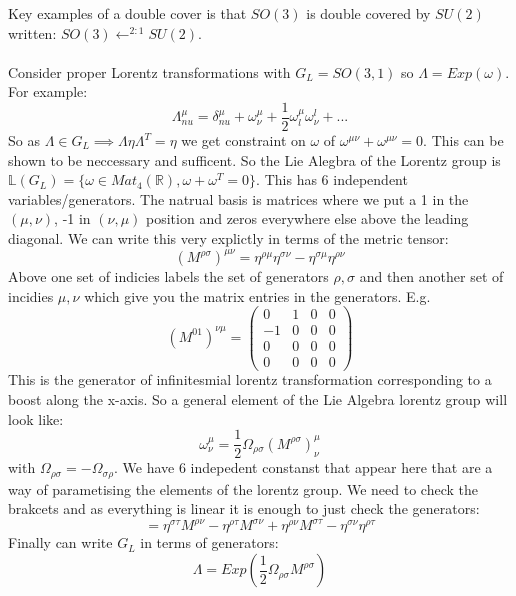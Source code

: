 \documentclass[12pt, a4paper, twoside, titlepage]{article}
\begin{document}
Key examples of a double cover is that $SO(3)$ is double covered by $SU(2)$ written: $SO(3) \leftarrow^{2:1} SU(2)$.\\\\
Consider proper Lorentz transformations with $G_L = SO(3,1)$ so $\Lambda = Exp(\omega)$. For example: $$\Lambda^{\mu}_{nu}  = \delta^{\mu}_{nu} + \omega^{\mu}_{\nu} + \frac{1}{2} \omega^{\mu}_l \omega^l_{\nu} + ...$$
So as $\Lambda \in G_L \implies \Lambda \eta \Lambda^T = \eta$ we get constraint on $\omega$ of $\omega^{\mu \nu} + \omega^{\mu \nu} = 0$. This can be shown to be neccessary and sufficent. So the Lie Alegbra of the Lorentz group is $\mathbb{L}(G_L) = \{\omega \in Mat_4(\mathbb{R}), \omega + \omega^T = 0\}$. This has 6 independent variables/generators. The natrual basis is matrices where we put a 1 in the $(\mu, \nu)$, -1 in $(\nu, \mu)$ position and zeros everywhere else above the leading diagonal. We can write this very explictly in terms of the metric tensor:
$$
(M^{\rho \sigma})^{\mu \nu} = \eta^{\rho \mu} \eta^{\sigma \nu} - \eta^{\sigma \mu} \eta^{\rho \nu}
$$
Above one set of indicies labels the set of generators $\rho, \sigma$ and then another set of incidies $\mu, \nu$ which give you the matrix entries in the generators. E.g.
$$
                (M^{01})^{\nu \mu} = \begin{pmatrix} 0 &1 & 0 & 0\\
                -1 & 0 & 0 &0\\ 
        0 & 0 & 0 & 0 \\
0& 0 & 0 & 0\end{pmatrix}
$$
This is the generator of infinitesmial lorentz transformation corresponding to a boost along the x-axis. So a general element of the Lie Algebra lorentz group will look like:
$$
\omega^{\mu}_{\nu} =  \frac{1}{2} \Omega_{\rho \sigma}(M^{\rho \sigma})^{\mu}_{\nu}
$$
with $\Omega_{\rho \sigma} = - \Omega_{\sigma \rho}$. We have 6 indepedent constanst that appear here that are a way of parametising the elements of the lorentz group. We need to check the brakcets and as everything is linear it is enough to just check the generators:
\begin{equation}
[M^{\rho \sigma}, M^{\tau \nu}] = \eta^{\sigma \tau}M^{\rho \nu} - \eta^{\rho \tau} M^{\sigma \nu} + \eta^{\rho \nu}M^{\sigma \tau} - \eta^{\sigma \nu} \eta^{\rho \tau} 
                \end{equation}
                Finally can write $G_L$ in terms of generators:
                $$
                \Lambda = Exp( \frac{1}{2} \Omega_{\rho \sigma}M^{\rho \sigma})
                $$
\end{document}
